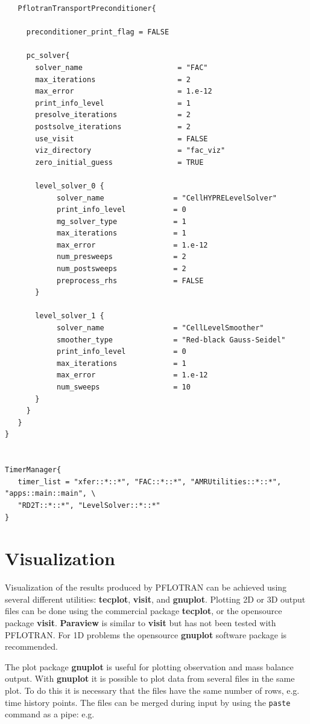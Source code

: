 \documentclass[12pt]{article}
\begin{document}
\begin{verbatim}
   PflotranTransportPreconditioner{

     preconditioner_print_flag = FALSE

     pc_solver{
       solver_name                      = "FAC"
       max_iterations                   = 2 
       max_error                        = 1.e-12
       print_info_level                 = 1 
       presolve_iterations              = 2
       postsolve_iterations             = 2
       use_visit                        = FALSE
       viz_directory                    = "fac_viz"
       zero_initial_guess               = TRUE

       level_solver_0 {
            solver_name                = "CellHYPRELevelSolver"
            print_info_level           = 0 
            mg_solver_type             = 1
            max_iterations             = 1
            max_error                  = 1.e-12
            num_presweeps              = 2
            num_postsweeps             = 2
            preprocess_rhs             = FALSE
       }

       level_solver_1 {
            solver_name                = "CellLevelSmoother"
            smoother_type              = "Red-black Gauss-Seidel"
            print_info_level           = 0 
            max_iterations             = 1
            max_error                  = 1.e-12
            num_sweeps                 = 10
       }
     } 
   }
}


TimerManager{
   timer_list = "xfer::*::*", "FAC::*::*", "AMRUtilities::*::*", "apps::main::main", \
   "RD2T::*::*", "LevelSolver::*::*"
}
\end{verbatim}
\normalsize

\section{Visualization}

Visualization of the results produced by PFLOTRAN can be achieved using several different utilities: {\bf tecplot}, {\bf visit}, and {\bf gnuplot}. Plotting 2D or 3D output files can be done using the commercial package {\bf tecplot}, or the opensource package {\bf visit}. {\bf Paraview} is similar to {\bf visit} but has not been tested with PFLOTRAN. For 1D problems the opensource {\bf gnuplot} software package is recommended.

The plot package {\bf gnuplot} is useful for plotting observation and mass balance output. With {\bf gnuplot} it is possible to plot data from several files in the same plot.
To do this it is necessary that the files have the same number of rows, e.g. time history points. The files can be merged during input by using the {\tt paste} command as a pipe: e.g.
\end{document}
